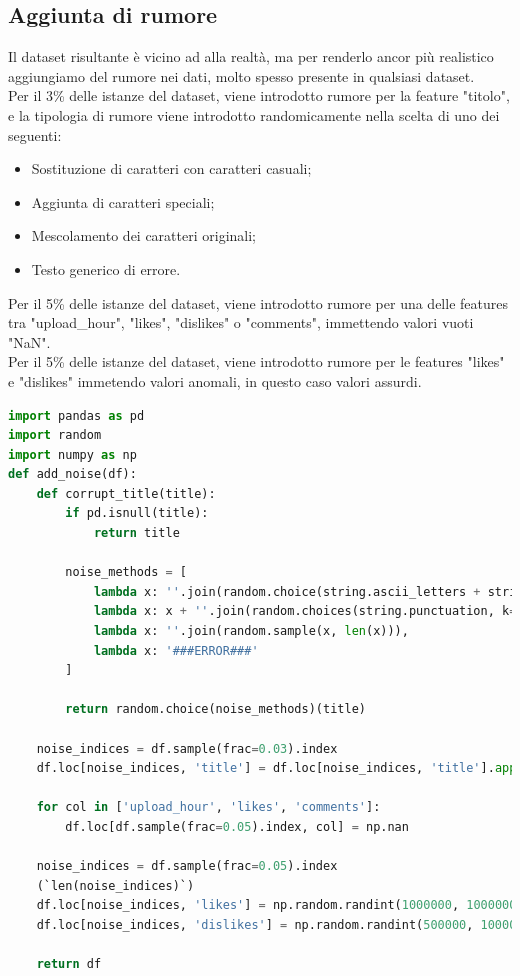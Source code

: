 \documentclass[a4paper,12pt]{report}
\begin{document}
\subsection{Aggiunta di rumore}
Il dataset risultante è vicino ad alla realtà, ma per renderlo ancor più realistico aggiungiamo del rumore nei dati, molto spesso presente in qualsiasi dataset.\\
Per il 3\% delle istanze del dataset, viene introdotto rumore per la feature "titolo", e la tipologia di rumore viene introdotto randomicamente nella scelta di uno dei seguenti:
\begin{itemize}
        \item Sostituzione di caratteri con caratteri casuali;
        \item Aggiunta di caratteri speciali;
        \item Mescolamento dei caratteri originali;
        \item Testo generico di errore.
\end{itemize}
Per il 5\% delle istanze del dataset, viene introdotto rumore per una delle features tra "upload\_hour", "likes", "dislikes" o "comments", immettendo valori vuoti "NaN".\\
Per il 5\% delle istanze del dataset, viene introdotto rumore per le features "likes" e "dislikes" immetendo valori anomali, in questo caso valori assurdi.
\\
\begin{lstlisting}[language=Python]
import pandas as pd
import random
import numpy as np
def add_noise(df):
    def corrupt_title(title):
        if pd.isnull(title):
            return title

        noise_methods = [
            lambda x: ''.join(random.choice(string.ascii_letters + string.digits + string.punctuation) for _ in range(len(x))),
            lambda x: x + ''.join(random.choices(string.punctuation, k=5)), 
            lambda x: ''.join(random.sample(x, len(x))),
            lambda x: '###ERROR###'
        ]

        return random.choice(noise_methods)(title)

    noise_indices = df.sample(frac=0.03).index
    df.loc[noise_indices, 'title'] = df.loc[noise_indices, 'title'].apply(corrupt_title)

    for col in ['upload_hour', 'likes', 'comments']:
        df.loc[df.sample(frac=0.05).index, col] = np.nan

    noise_indices = df.sample(frac=0.05).index
    (`len(noise_indices)`)
    df.loc[noise_indices, 'likes'] = np.random.randint(1000000, 10000000, len(noise_indices))
    df.loc[noise_indices, 'dislikes'] = np.random.randint(500000, 1000000, len(noise_indices))

    return df
\end{lstlisting}
\newpage
\end{document}
